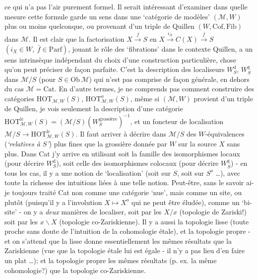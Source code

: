 ce qui n’a pas l’air purement formel. Il serait intéressant d’examiner dans quelle mesure cette formule garde un sens dans une ‘catégorie de modèles’ $(\mathcal{M},W)$ plus ou moins quelconque, ou provenant d’un triple de Quillen $(W,\mathrm{Cof},\mathrm{Fib})$ dans $\mathcal{M}$. Il est clair que la factorisation $X \xrightarrow{f} S$ en $X \xrightarrow{i_X} C(X) \xrightarrow{\bar{f}} S$ $(i_X \in W,\ \bar{f} \in \mathrm{Parf})$, jouant le rôle des ‘fibrations’ dans le contexte Quillen, a un sens intrinsèque indépendant du choix d’une construction particulière, chose qu’on peut préciser de façon parfaite. C’est la description des localiseurs $W_S^{\mathrm{d}}$, $W_S^{\mathrm{g}}$ dans $\mathcal{M}/S$ (pour $S \in \mathrm{Ob}\,\mathcal{M}$) qui n’est pas comprise de façon générale, en dehors du cas $\mathcal{M} = \mathrm{Cat}$. En d’autre termes, je ne comprends pas comment construire des catégories $\mathrm{HOT}_{\mathcal{M},W}(S)$, $\mathrm{HOT}^{o}_{\mathcal{M},W}(S)$, même si $(\mathcal{M},W)$ provient d’un triple de Quillen, je vois seulement la description d’une catégorie $\mathrm{HOT}^{\mathrm{lc}}_{\mathcal{M},W}(S) = (\mathcal{M}/S)(W_S^{\text{grossière}})^{-1}$, et un foncteur de localisation $\mathcal{M}/S \longrightarrow \mathrm{HOT}^{\mathrm{lc}}_{\mathcal{M},W}(S)$. Il faut arriver à décrire dans $\mathcal{M}/S$ des $W$-équivalences (\textit{‘relatives à $S$’}) plus fines que la grossière donnée par $W$ sur la source $X$ sans plus. Dans Cat j’y arrive en utilisant soit la famille des isomorphismes locaux (pour décrire $W_S^{\mathrm{d}}$), soit celle des isomorphismes colocaux (pour décrire $W_S^{\mathrm{g}}$) - en tous les cas, il y a une notion de ‘localisation’ (soit sur $S$, soit sur $S^{o}$ \dots), avec %
toute la richesse des intuitions liées à une telle notion. Peut-être, sans le savoir ai-je toujours traité Cat non comme une catégorie ‘nue’, mais comme un site, ou plutôt (puisqu’il
y a l’involution $X \longmapsto X^{o}$ qui ne peut être éludée), comme un ‘bi-site’ - on y a \textit{deux} manières de localiser, soit par les $X/x$ (topologie de Zariski!) soit par les $x\backslash X$ (topologie co-Zariskienne). Il y a aussi la topologie lisse (toute proche sans doute de l’intuition de la cohomologie étale), et la topologie propre - et on s’attend que la lisse donne essentiellement les mêmes résultats que la Zariskienne (vue que la topologie étale lui est égale - il n’y a pas lieu d’en faire un plat \dots); et la topologie propre les mêmes résultats (p. ex. la même cohomologie?) que la topologie co-Zariskienne. %


